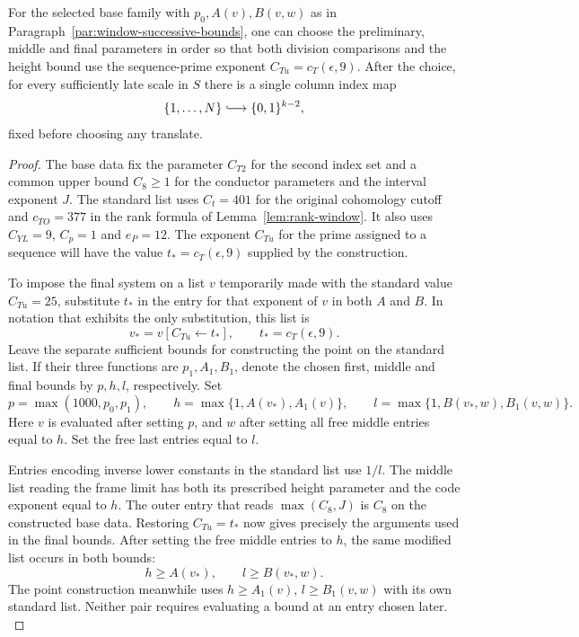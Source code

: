 \begin{lemma}\label{lem:window-parameter-choice}
For the selected base family with \(p_0,A(v),B(v,w)\) as in
Paragraph~\ref{par:window-successive-bounds},
one can choose the preliminary, middle and final parameters in order
so that both division comparisons and the height bound use the
sequence-prime exponent \(C_{Tu}=c_T(\epsilon,9)\).
After the choice, for every sufficiently late scale in \(S\) there is a single column index map
\[
 \{1,\ldots,N\}\lhook\joinrel\longrightarrow\{0,1\}^{k-2},
\]
fixed before choosing any translate.
\end{lemma}

\begin{proof}
The base data fix the parameter \(C_{T2}\) for the second
index set and a common upper bound \(C_8\ge1\) for the
conductor parameters and the interval exponent \(J\).
The standard list uses \(C_t=401\) for the original cohomology
cutoff and \(c_{TO}=377\) in the rank formula of
Lemma~\ref{lem:rank-window}. It also uses \(C_{YL}=9\),
\(C_p=1\) and \(e_P=12\).
The exponent \(C_{Tu}\) for the prime assigned to a sequence
will have the value \(t_*=c_T(\epsilon,9)\) supplied by the
construction.

To impose the final system on a
list \(v\) temporarily made with the standard value
\(C_{Tu}=25\), substitute \(t_*\) in the entry for that exponent
of \(v\) in both \(A\) and \(B\). In notation that exhibits the only substitution, this list is
\[
 v_* = v[C_{Tu}\leftarrow t_*],\qquad t_*=c_T(\epsilon,9).
\] Leave the separate sufficient bounds for
constructing the point on the standard list. If their three
functions are \(p_1,A_1,B_1\), denote the chosen first, middle
and final bounds by \(p,h,l\), respectively. Set
\[
 p=\max(1000,p_0,p_1),\qquad
 h=\max\{1,A(v_*),A_1(v)\},\qquad
 l=\max\{1,B(v_*,w),B_1(v,w)\}.
\]
Here \(v\) is evaluated after setting \(p\), and \(w\) after
setting all free middle entries equal to \(h\). Set the free
last entries equal to \(l\).

Entries encoding inverse lower
constants in the standard list use \(1/l\).
The middle list reading the frame limit has both its prescribed
height parameter and the code exponent equal to \(h\). The
outer entry that reads \(\max(C_8,J)\) is \(C_8\) on the
constructed base data. Restoring \(C_{Tu}=t_*\) now gives precisely
the arguments used in the final bounds. After setting the free middle entries to \(h\), the same modified list occurs in both bounds:
\[
 h\ge A(v_*),\qquad l\ge B(v_*,w).
\] The point construction meanwhile uses
\(h\ge A_1(v)\), \(l\ge B_1(v,w)\) with its own standard list.
Neither pair requires evaluating a bound at an entry chosen later.
\label{cor:window-points-1}


\end{proof}
